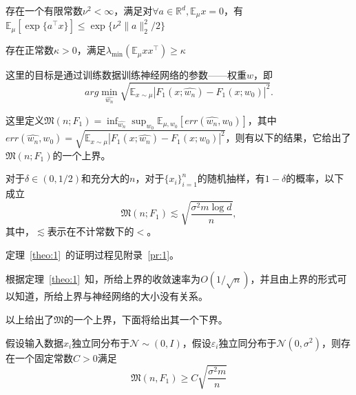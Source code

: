 \begin{assumption}
存在一个有限常数$\nu^2< \infty$，满足对$\forall a \in \mathbb{R}^d, \mathbb{E}_\mu x = 0$，有$\mathbb{E}_\mu[\exp\{a^\top x\}]\leq \exp\{\nu^2\|a\|_2^2/2\}$
\end{assumption}
\begin{assumption}
存在正常数$\kappa > 0$，满足$\lambda_{\min}(\mathbb{E}_\mu x x^\top )\geq \kappa$
\end{assumption}
\par
这里的目标是通过训练数据训练神经网络的参数——权重$w$，即
\[
	arg\min_{\hat{w_n}} \sqrt{\mathbb{E}_{x\sim\mu}|F_1(x;\hat{w_n})- F_1(x;w_0)|^2}.
\]
\par
这里定义$\mathfrak{M}(n;F_1) = \inf_{\hat{w_n}}\sup_{w_0}\mathbb{E}_{\mu,w_0}[err(\hat{w_n},w_0)]$，其中$err(\hat{w_n},w_0) = \sqrt{\mathbb{E}_{x\sim\mu}|F_1(x;\hat{w_n})- F_1(x;w_0)|^2}$，则有以下的结果，它给出了$\mathfrak{M}(n;F_1)$的一个上界。
\begin{theorem}\label{theo:1}
对于$\delta\in (0,1/2)$和充分大的$n$，对于$\{x_i\}_{i=1}^n$的随机抽样，有$1-\delta$的概率，以下成立
\[
	\mathfrak{M}(n;F_1) \lesssim \sqrt{\frac{\sigma^2 m \log d}{n}},
\]
其中，$\lesssim$表示在不计常数下的$<$。
\end{theorem}
\par
定理~\ref{theo:1}~的证明过程见附录~\ref{pr:1}。

\par
根据定理~\ref{theo:1}~知，所给上界的收敛速率为$O(1/\sqrt{n})$，并且由上界的形式可以知道，所给上界与神经网络的大小没有关系。
\par
以上给出了$\mathfrak{M}$的一个上界，下面将给出其一个下界。
\begin{theorem}\label{theo:2}
假设输入数据$x_i$独立同分布于$\mathcal{N}\sim (0,I)$，假设$\varepsilon_i$独立同分布于$\mathcal{N}(0,\sigma^2)$，则存在一个固定常数$C > 0$满足
\begin{equation}
\mathfrak{M}(n,F_1) \geq C\sqrt{\frac{\sigma^2 m}{n}}
\end{equation}
\end{theorem}



